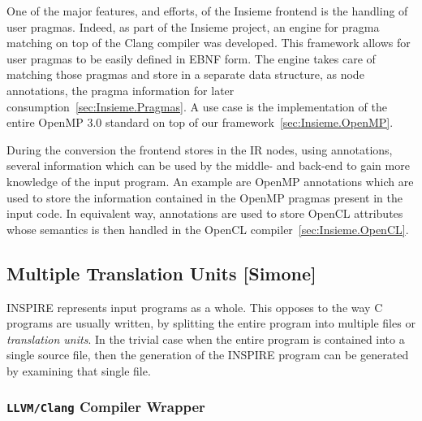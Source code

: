 One of the major features, and efforts, of the Insieme frontend is the handling
of user pragmas. Indeed, as part of the Insieme project, an engine for pragma
matching on top of the Clang compiler was developed. This framework allows for
user pragmas to be easily defined in EBNF form. The engine takes care of
matching those pragmas and store in a separate data structure, as node
annotations, the pragma information for later
consumption~\ref{sec:Insieme.Pragmas}. A use case is the implementation of the
entire OpenMP 3.0 standard on top of our framework~\ref{sec:Insieme.OpenMP}.

During the conversion the frontend stores in the IR nodes, using annotations,
several information which can be used by the middle- and back-end to gain more
knowledge of the input program. An example are OpenMP annotations which are used
to store the information contained in the OpenMP pragmas present in the input
code. In equivalent way, annotations are used to store OpenCL attributes whose
semantics is then handled in the OpenCL compiler~\ref{sec:Insieme.OpenCL}.

\subsection{Multiple Translation Units [Simone]}
\label{sec:Insieme.Frontend.TranslationUnits}

INSPIRE represents input programs as a whole. This opposes to the way C programs
are usually written, by splitting the entire program into multiple files or
\emph{translation units}. In the trivial case when the entire program is
contained into a single source file, then the generation of the INSPIRE program
can be generated by examining that single file.

\subsubsection{{\tt LLVM/Clang} Compiler Wrapper}

